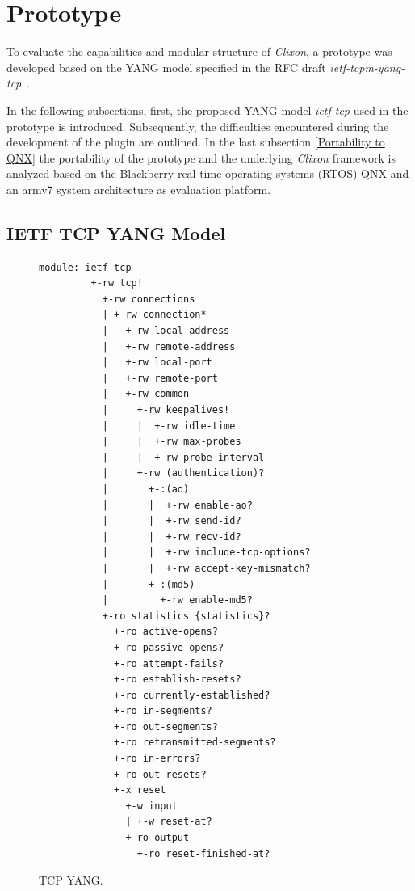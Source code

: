 \section{Prototype}
\label{sec:prototype}
To evaluate the capabilities and modular structure of \textit{Clixon}, a prototype was developed based on the YANG model specified in the RFC draft \textit{ietf-tcpm-yang-tcp}~\cite{draft-ietf-tcpm-yang-tcp}.

In the following subsections, first, the proposed YANG model \textit{ietf-tcp} used in the prototype is introduced. Subsequently, the difficulties encountered during the development of the plugin are outlined. In the last subsection \ref{Portability to QNX} the portability of the prototype and the underlying \textit{Clixon} framework is analyzed based on the Blackberry real-time operating systems (RTOS) QNX and an armv7 system architecture as evaluation platform.

\subsection{IETF TCP YANG Model}
\label{IETF TCP YANG Model}

\begin{figure}[htbp]
    \centering
    \begin{lstlisting}[gobble=8,language={}]
        module: ietf-tcp
         +-rw tcp!
           +-rw connections
           | +-rw connection*
           |   +-rw local-address     
           |   +-rw remote-address    
           |   +-rw local-port        
           |   +-rw remote-port       
           |   +-rw common
           |     +-rw keepalives! 
           |     |  +-rw idle-time         
           |     |  +-rw max-probes        
           |     |  +-rw probe-interval    
           |     +-rw (authentication)?
           |       +-:(ao)
           |       |  +-rw enable-ao?            
           |       |  +-rw send-id?              
           |       |  +-rw recv-id?              
           |       |  +-rw include-tcp-options?  
           |       |  +-rw accept-key-mismatch?  
           |       +-:(md5)
           |         +-rw enable-md5?            
           +-ro statistics {statistics}?
             +-ro active-opens?             
             +-ro passive-opens?            
             +-ro attempt-fails?            
             +-ro establish-resets?         
             +-ro currently-established?    
             +-ro in-segments?              
             +-ro out-segments?             
             +-ro retransmitted-segments?   
             +-ro in-errors?                
             +-ro out-resets?               
             +-x reset
               +-w input
               | +-w reset-at?  
               +-ro output
                 +-ro reset-finished-at?  
        \end{lstlisting}
    \caption{TCP YANG.}
    \label{fig:ietf-yang}
\end{figure}

